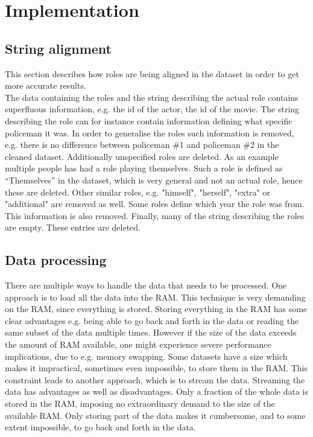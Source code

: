 
\section{Implementation}

\subsection{String alignment}
This section describes how roles are being aligned in the dataset in order to get more accurate results.\\
The data containing the roles and the string describing the actual role contains superfluous information, e.g. the id of the actor, the id of the movie. The string describing the role can for instance contain information defining what specific policeman it was. In order to generalise the roles such information is removed, e.g. there is no difference between policeman \#1 and policeman \#2 in the cleaned dataset. Additionally unspecified roles are deleted. As an example multiple people has had a role playing themselves. Such a role is defined as “Themselves” in the dataset, which is very general and not an actual role, hence these are deleted. Other similar roles, e.g. "himself", "herself", "extra" or "additional" are removed as well. Some roles define which year the role was from. This information is also removed. Finally, many of the string describing the roles are empty. These entries are deleted.

\subsection{Data processing}
There are multiple ways to handle the data that needs to be processed.
One approach is to load all the data into the RAM. This technique is very demanding on the RAM, since everything is stored. Storing everything in the RAM has some clear advantages e.g. being able to go back and forth in the data or reading the same subset of the data multiple times. However if the size of the data exceeds the amount of RAM available, one might experience severe performance implications, due to e.g. memory swapping.
Some datasets have a size which makes it impractical, sometimes even impossible, to store them in the RAM. This constraint leads to another approach, which is to stream the data. Streaming the data has advantages as well as disadvantages. Only a fraction of the whole data is stored in the RAM, imposing no extraordinary demand to the size of the available RAM. Only storing part of the data makes it cumbersome, and to some extent impossible, to go back and forth in the data.


